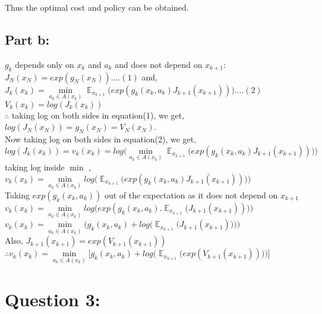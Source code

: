 \documentclass{article}
\begin{document}
Thus the optimal cost and policy can be obtained.





\subsection{Part b:}
$g_k$ depends only on $x_k$ and $a_k$ and does not depend on $x_{k+1}$:\\
$J_N(x_N)=exp(g_N(x_N)) ....(1)$ and, \\
$J_k(x_k)=\min\limits_{a_k \in A(x_k)} \displaystyle \mathop{\mathbb{E}}_{x_{k+1}} \big(  exp(g_k(x_k,a_k)J_{k+1}(x_{k+1}))\big)....(2)$\\
$V_k(x_k)=log(J_k(x_k))$\\
$\therefore  $ taking log on both sides in equation(1), we get,\\
$ log(J_N(x_N)) = g_N(x_N) = V_N(x_N)$.\\
Now taking log on both sides in equation(2), we get,\\
$ log(J_k(x_k)) =v_k(x_k)= log\Big( \min\limits_{a_k \in A(x_k)} \displaystyle \mathop{\mathbb{E}}_{x_{k+1}} \big(  exp(g_k(x_k,a_k)J_{k+1}(x_{k+1}))\big) \Big)$\\
taking log inside $\min$ ,\\
$v_k(x_k)=\min\limits_{a_k \in A(x_k)} log \Big( \displaystyle \mathop{\mathbb{E}}_{x_{k+1}} \big(  exp(g_k(x_k,a_k)J_{k+1}(x_{k+1}))\big)\Big)$\\
Taking $exp(g_k(x_k,a_k))$ out of the expectation as it does not depend on $x_{k+1}$\\
$v_k(x_k)=\min\limits_{a_k \in A(x_k)} log \Big(exp(g_k(x_k,a_k)  . \displaystyle \mathop{\mathbb{E}}_{x_{k+1}} \big( J_{k+1}(x_{k+1}))\big)\Big)$\\
$v_k(x_k)=\min\limits_{a_k \in A(x_k)} \Big(g_k(x_k,a_k)  + log \big( \displaystyle \mathop{\mathbb{E}}_{x_{k+1}} \big( J_{k+1}(x_{k+1})\big)\big)\Big)$\\
Also, $J_{k+1}(x_{k+1})=exp(V_{k+1}(x_{k+1}))$\\
$\therefore v_k(x_k)=\min\limits_{a_k \in A(x_k)} \Big[g_k(x_k,a_k)  + log \big(\displaystyle \mathop{\mathbb{E}}_{x_{k+1}} \big( exp(V_{k+1}(x_{k+1})))\big)\Big]$\\




\section{Question 3:}
\end{document}
